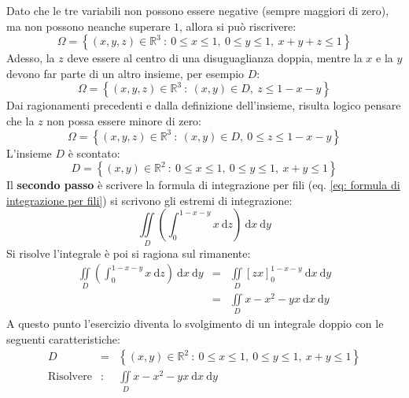 \documentclass[a4paper]{article}
\begin{document}
	Dato che le tre variabili non possono essere negative (sempre maggiori di zero), ma non possono neanche superare $1$, allora si può riscrivere:
	\begin{equation*}
		\Omega = \left\{\left(x,y,z\right) \in \mathbb{R}^{3} \: : \: 0 \le x \le 1, \: 0 \le y \le 1, \: x+y+z\le 1\right\}
	\end{equation*}
	Adesso, la $z$ deve essere al centro di una disuguaglianza doppia, mentre la $x$ e la $y$ devono far parte di un altro insieme, per esempio $D$:
	\begin{equation*}
		\Omega = \left\{\left(x,y,z\right) \in \mathbb{R}^{3} \: : \: \left(x,y\right) \in D, \: z\le 1-x-y\right\}
	\end{equation*}
	Dai ragionamenti precedenti e dalla definizione dell'insieme, risulta logico pensare che la $z$ non possa essere minore di zero:
	\begin{equation*}
		\Omega = \left\{\left(x,y,z\right) \in \mathbb{R}^{3} \: : \: \left(x,y\right) \in D, \: 0 \le z\le 1-x-y\right\}
	\end{equation*}
	L'insieme $D$ è scontato:
	\begin{equation*}
		D = \left\{\left(x,y\right) \in \mathbb{R}^{2} \: : \: 0 \le x \le 1, \: 0 \le y \le 1, \: x+y \le 1\right\}
	\end{equation*}
	Il \textbf{secondo passo} è scrivere la formula di integrazione per fili (eq. \ref{eq: formula di integrazione per fili}) si scrivono gli estremi di integrazione:
	\begin{equation*}
		\displaystyle\iint\limits_{D}\left(\int_{0}^{1-x-y} x \:\mathrm{d}z\right) \:\mathrm{d}x\:\mathrm{d}y
	\end{equation*}
	Si risolve l'integrale è poi si ragiona sul rimanente:
	\begin{equation*}
		\begin{array}{rcl}
			\displaystyle\iint\limits_{D}\left(\int_{0}^{1-x-y} x \:\mathrm{d}z\right) \:\mathrm{d}x\:\mathrm{d}y
			&=&
			\displaystyle\iint\limits_{D}\left[ zx \right]_{0}^{1-x-y} \:\mathrm{d}x\:\mathrm{d}y \\ [2em]
			&=&
			\displaystyle\iint\limits_{D} x - x^{2} - yx \:\mathrm{d}x\:\mathrm{d}y
		\end{array}
	\end{equation*}
	A questo punto l'esercizio diventa lo svolgimento di un integrale doppio con le seguenti caratteristiche:
	\begin{equation*}
		\begin{array}{rcl}
			D &=& \left\{\left(x,y\right) \in \mathbb{R}^{2} \: : \: 0 \le x \le 1, \: 0 \le y \le 1, \: x+y \le 1\right\} \\ [1.5em]
			\text{Risolvere} &:& \displaystyle\iint\limits_{D} x - x^{2} - yx \:\mathrm{d}x\:\mathrm{d}y
		\end{array}
	\end{equation*}
\end{document}
